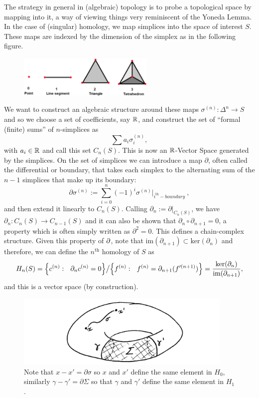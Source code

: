 The strategy in general in (algebraic) topology is to probe a topological space by mapping into it, a way of viewing things very reminiscent of the Yoneda Lemma.
In the case of (singular) homology, we map simplices into the space of interest $S$. These maps are indexed by the dimension of the simplex as in the following figure.
\begin{figure}[!ht]
\centering
\includegraphics[width=6.5cm]{images/Lecture 1/simplex.png}
\end{figure}
We want to construct an algebraic structure around these maps $\sigma^{(n)}:\Delta^n\to S$ and so we  choose a set of coefficients, say $\mathbb{R}$, and construct the set of ``formal (finite) sums''  of $n$-simplices as
$$\sum a_i\sigma^{(n)}_i  ,$$
with $a_i\in\mathbb{R}$ and call this set $C_n(S)$. This is now an $\mathbb{R}$-Vector Space generated by the simplices. On the set of simplices we can introduce a map $\partial$, often called the differential or boundary, that takes each simplex to the alternating sum of the $n-1$ simplices that make up its boundary:
$$\partial\sigma^{(n)}:=\sum_{i=0}^{n}(-1)^i\sigma^{(n)}|_{i^{\text{th}}-boundary} \ ,$$
and then extend it linearly to $C_n(S)$. Calling $\partial_n:=\partial|_{C_n(S)}$, we have $\partial_n:C_n(S)\to C_{n-1}(S)$ and it can also be shown that $\partial_n \circ\partial_{n+1}=0$, a property which is often simply written as $\partial^2=0$. This defines a chain-complex structure.
Given this property of $\partial$, note that $\text{im}(\partial_{n+1})\subset \text{ker}(\partial_n)$ and therefore, we can define the $n^{\text{th}}$ homology of $S$ as
\begin{equation*}
    H_n(S)=\Big\{c^{(n)}: \ \ \partial_n c^{(n)}=0\Big\}\big{/}\Big\{f^{(n)}: \ \ f^{(n)}=\partial_{n+1} (f'^{(n+1)})\Big\}=\frac{\text{ker}(\partial_n)}{\text{im}(\partial_{n+1})},
\end{equation*}
and this is a vector space (by construction).
\begin{figure}[!ht]
\centering
\captionsetup{labelformat=empty, format = hang}
\begin{measuredfigure}
\includegraphics[width=10.40cm]{images/Lecture 1/homology.jpeg}
\caption{\small{Note that $x-x'=\partial\sigma$ so $x$ and $x'$ define the same element in $H_0$, similarly $\gamma-\gamma'=\partial\Sigma$ so that $\gamma$ and $\gamma'$ define the same element in $H_1$.}}
\end{measuredfigure}
\end{figure}

